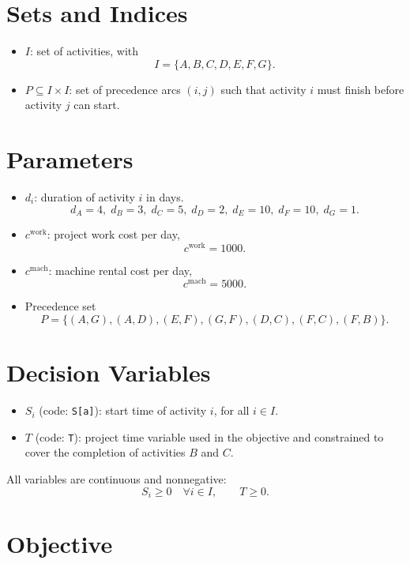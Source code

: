 \section*{Sets and Indices}

\begin{itemize}
    \item $I$: set of activities, with
    \[
    I=\{A,B,C,D,E,F,G\}.
    \]
    \item $P \subseteq I \times I$: set of precedence arcs $(i,j)$ such that activity $i$ must finish before activity $j$ can start.
\end{itemize}

\section*{Parameters}

\begin{itemize}
    \item $d_i$: duration of activity $i$ in days.
    \[
    d_A=4,\;
    d_B=3,\;
    d_C=5,\;
    d_D=2,\;
    d_E=10,\;
    d_F=10,\;
    d_G=1.
    \]
    \item $c^{\text{work}}$: project work cost per day,
    \[
    c^{\text{work}}=1000.
    \]
    \item $c^{\text{mach}}$: machine rental cost per day,
    \[
    c^{\text{mach}}=5000.
    \]
    \item Precedence set
    \[
    P=\{(A,G),(A,D),(E,F),(G,F),(D,C),(F,C),(F,B)\}.
    \]
\end{itemize}

\section*{Decision Variables}

\begin{itemize}
    \item $S_i$ (code: \texttt{S[a]}): start time of activity $i$, for all $i \in I$.
    \item $T$ (code: \texttt{T}): project time variable used in the objective and constrained to cover the completion of activities $B$ and $C$.
\end{itemize}

All variables are continuous and nonnegative:
\[
S_i \ge 0 \quad \forall i \in I, \qquad T \ge 0.
\]

\section*{Objective}

